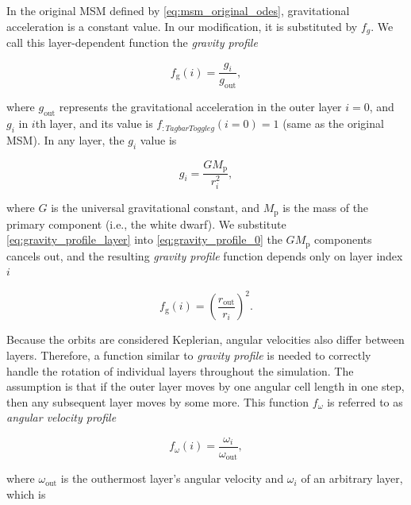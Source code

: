     In the original MSM defined by \eqref{eq:msm_original_odes}, gravitational acceleration is a constant value. In our modification, it is substituted by $f_g$. We call this layer-dependent function the \emph{gravity profile} 

    \begin{equation}
        f_{\mathrm{g}}(i) = \frac{g_i}{g_{\mathrm{out}}},
        \label{eq:gravity_profile_0}
    \end{equation}

    where $g_{\mathrm{out}}$ represents the gravitational acceleration in the outer layer $i=0$, and $g_i$ in $i$th layer, and its value is ${f_{\mathrm:TagbarToggle
    {g}}(i=0) = 1}$ (same as the original MSM). In any layer, the $g_i$ value is 

    \begin{equation}
        g_i = \frac{GM_{\mathrm{p}}}{r_i^2},
        \label{eq:gravity_profile_layer}
    \end{equation}

    where $G$ is the universal gravitational constant, and $M_{\mathrm{p}}$ is the mass of the primary component (i.e., the white dwarf). We substitute \eqref{eq:gravity_profile_layer} into \eqref{eq:gravity_profile_0} the $GM_{\mathrm{p}}$ components cancels out, and the resulting \emph{gravity profile} function depends only on layer index $i$

    \begin{equation}
        f_{\mathrm{g}}(i) = \left( \frac{r_{\mathrm{out}}}{r_i} \right)^2.
        \label{eq:gravity_profile_final}
    \end{equation}


    Because the orbits are considered Keplerian, angular velocities also differ between layers. Therefore, a function similar to \emph{gravity profile} is needed to correctly handle the rotation of individual layers throughout the simulation. The assumption is that if the outer layer moves by one angular cell length in one step, then any subsequent layer moves by some more. This function $f_{\omega}$ is referred to as \emph{angular velocity profile}

    \begin{equation}
        f_{\omega}(i) = \frac{\omega_i}{\omega_\mathrm{out}},
        \label{eq:av_profile_0}
    \end{equation}

    where $\omega_{\mathrm{out}}$ is the outhermost layer's angular velocity and $\omega_i$ of an arbitrary layer, which is 

